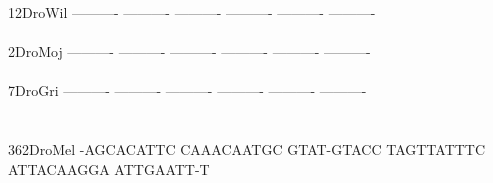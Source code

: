 \documentclass[11pt,twoside,reqno,a4paper]{article}
\begin{document}
{12\hspace*{3\charwidth}DroWil	----------	----------	----------	----------	----------	----------	\\
\hspace*{5\charwidth}\hspace*{7\charwidth}\hspace*{1\charwidth}\hspace*{1\charwidth}\hspace*{1\charwidth}\hspace*{1\charwidth}\hspace*{1\charwidth}\hspace*{1\charwidth}\\
2\hspace*{4\charwidth}DroMoj	----------	----------	----------	----------	----------	----------	\\
\hspace*{5\charwidth}\hspace*{7\charwidth}\hspace*{1\charwidth}\hspace*{1\charwidth}\hspace*{1\charwidth}\hspace*{1\charwidth}\hspace*{1\charwidth}\hspace*{1\charwidth}\\
7\hspace*{4\charwidth}DroGri	----------	----------	----------	----------	----------	----------	\\
\hspace*{5\charwidth}\hspace*{7\charwidth}\hspace*{1\charwidth}\hspace*{1\charwidth}\hspace*{1\charwidth}\hspace*{1\charwidth}\hspace*{1\charwidth}\hspace*{1\charwidth}\\
\\
362\hspace*{2\charwidth}DroMel	-AGCACATTC	CAAACAATGC	GTAT-GTACC	TAGTTATTTC	ATTACAAGGA	ATTGAATT-T	\\
\hspace*{5\charwidth}\hspace*{7\charwidth}\hspace*{1\charwidth}\hspace*{1\charwidth}\hspace*{1\charwidth}\hspace*{1\charwidth}\hspace*{1\charwidth}\hspace*{1\charwidth}\\
}
\end{document}
